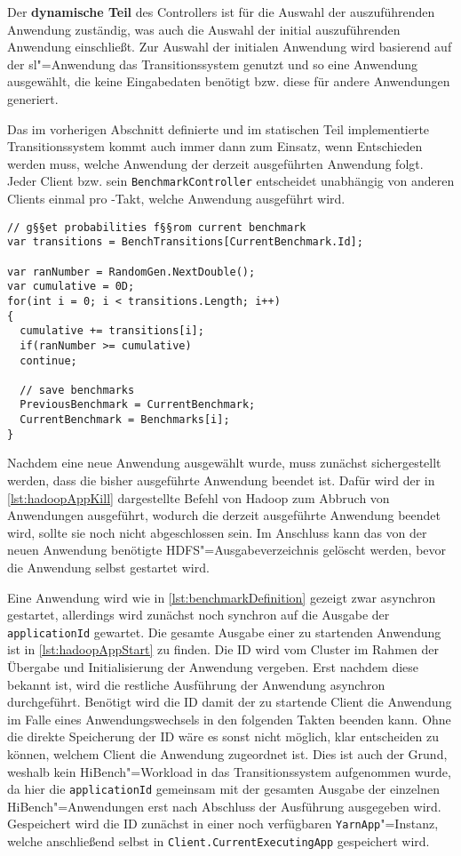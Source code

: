 Der \textbf{dynamische Teil} des Controllers ist für die Auswahl der auszuführenden Anwendung zuständig, was auch die Auswahl der initial auszuführenden Anwendung einschließt.
Zur Auswahl der initialen Anwendung wird basierend auf der \acl{sl}"=Anwendung das Transitionssystem genutzt und so eine Anwendung ausgewählt, die keine Eingabedaten benötigt bzw. diese für andere Anwendungen generiert.

Das im vorherigen Abschnitt definierte und im statischen Teil implementierte Transitionssystem kommt auch immer dann zum Einsatz, wenn Entschieden werden muss, welche Anwendung der derzeit ausgeführten Anwendung folgt.
Jeder Client bzw. sein \texttt{BenchmarkController} entscheidet unabhängig von anderen Clients einmal pro \sS-Takt, welche Anwendung ausgeführt wird.

\begin{lstlisting}[label=lst:benchmarkChanging,style=cs,
caption={[Normalisierung und Auswahl der nachfolgenden Anwendung]
    Normalisierung und Auswahl der nachfolgenden Anwendung (gekürzt)}]
// g§§et probabilities f§§rom current benchmark
var transitions = BenchTransitions[CurrentBenchmark.Id];

var ranNumber = RandomGen.NextDouble();
var cumulative = 0D;
for(int i = 0; i < transitions.Length; i++)
{
  cumulative += transitions[i];
  if(ranNumber >= cumulative)
  continue;
  
  // save benchmarks
  PreviousBenchmark = CurrentBenchmark;
  CurrentBenchmark = Benchmarks[i];
}
\end{lstlisting}

Nachdem eine neue Anwendung ausgewählt wurde, muss zunächst sichergestellt werden, dass die bisher ausgeführte Anwendung beendet ist.
Dafür wird der in \cref{lst:hadoopAppKill} dargestellte Befehl von Hadoop zum Abbruch von Anwendungen ausgeführt, wodurch die derzeit ausgeführte Anwendung beendet wird, sollte sie noch nicht abgeschlossen sein.
Im Anschluss kann das von der neuen Anwendung benötigte \ac{HDFS}"=Ausgabeverzeichnis gelöscht werden, bevor die Anwendung selbst gestartet wird.

Eine Anwendung wird wie in \cref{lst:benchmarkDefinition} gezeigt zwar asynchron gestartet, allerdings wird zunächst noch synchron auf die Ausgabe der \texttt{applicationId} gewartet.
Die gesamte Ausgabe einer zu startenden Anwendung ist in \cref{lst:hadoopAppStart} zu finden.
Die ID wird vom Cluster im Rahmen der Übergabe und Initialisierung der Anwendung vergeben.
Erst nachdem diese bekannt ist, wird die restliche Ausführung der Anwendung asynchron durchgeführt.
Benötigt wird die ID damit der zu startende Client die Anwendung im Falle eines Anwendungswechsels in den folgenden Takten beenden kann.
Ohne die direkte Speicherung der ID wäre es sonst nicht möglich, klar entscheiden zu können, welchem Client die Anwendung zugeordnet ist.
Dies ist auch der Grund, weshalb kein HiBench"=Workload in das Transitionssystem aufgenommen wurde, da hier die \texttt{applicationId} gemeinsam mit der gesamten Ausgabe der einzelnen HiBench"=Anwendungen erst nach Abschluss der Ausführung ausgegeben wird.
Gespeichert wird die ID zunächst in einer noch verfügbaren \texttt{YarnApp}"=Instanz, welche anschließend selbst in \texttt{Client.CurrentExecutingApp} gespeichert wird.
